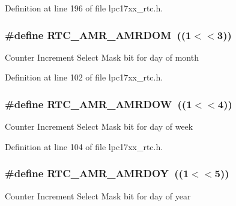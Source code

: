 \-Definition at line 196 of file lpc17xx\-\_\-rtc.\-h.

\hypertarget{group___r_t_c___private___macros_ga9f80d3076405906a1732aa27748e7a88}{
\subsubsection[{\-R\-T\-C\-\_\-\-A\-M\-R\-\_\-\-A\-M\-R\-D\-O\-M}]{\setlength{\rightskip}{0pt plus 5cm}\#define {\bf \-R\-T\-C\-\_\-\-A\-M\-R\-\_\-\-A\-M\-R\-D\-O\-M}~((1$<$$<$3))}}\label{group___r_t_c___private___macros_ga9f80d3076405906a1732aa27748e7a88}
\-Counter \-Increment \-Select \-Mask bit for day of month 

\-Definition at line 102 of file lpc17xx\-\_\-rtc.\-h.

\hypertarget{group___r_t_c___private___macros_gadd6ba0b814cad45a391307d0b0d612e0}{
\subsubsection[{\-R\-T\-C\-\_\-\-A\-M\-R\-\_\-\-A\-M\-R\-D\-O\-W}]{\setlength{\rightskip}{0pt plus 5cm}\#define {\bf \-R\-T\-C\-\_\-\-A\-M\-R\-\_\-\-A\-M\-R\-D\-O\-W}~((1$<$$<$4))}}\label{group___r_t_c___private___macros_gadd6ba0b814cad45a391307d0b0d612e0}
\-Counter \-Increment \-Select \-Mask bit for day of week 

\-Definition at line 104 of file lpc17xx\-\_\-rtc.\-h.

\hypertarget{group___r_t_c___private___macros_ga941c587216a505a651b46cfffc24e7ec}{
\subsubsection[{\-R\-T\-C\-\_\-\-A\-M\-R\-\_\-\-A\-M\-R\-D\-O\-Y}]{\setlength{\rightskip}{0pt plus 5cm}\#define {\bf \-R\-T\-C\-\_\-\-A\-M\-R\-\_\-\-A\-M\-R\-D\-O\-Y}~((1$<$$<$5))}}\label{group___r_t_c___private___macros_ga941c587216a505a651b46cfffc24e7ec}
\-Counter \-Increment \-Select \-Mask bit for day of year 

